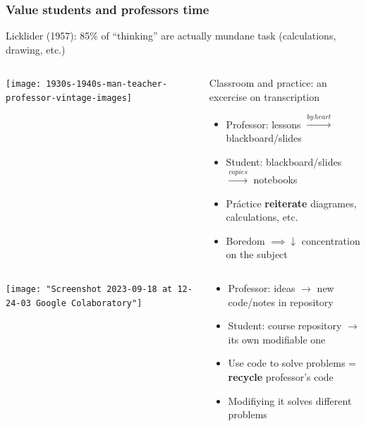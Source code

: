 \documentclass[aspectratio=169]{beamer}
\begin{document}
\begin{frame}
	\frametitle{Value students and professors time}
	Licklider (1957): 85\% of ``thinking'' are actually mundane task (calculations, drawing, etc.)
	\pause
	\begin{block}{}
	  \begin{columns}[b]
			\begin{column}{0.25\textwidth}
				\texttt{[image: 1930s-1940s-man-teacher-professor-vintage-images]}
			\end{column}
			\begin{column}{0.65\textwidth}
				Classroom and practice: an excercise on transcription
				\begin{itemize}[<+->]
					\item Professor: lessons \(\xrightarrow{by\, heart}\) blackboard/slides
					\item Student: blackboard/slides \(\xrightarrow{copies}\) notebooks
					\item Práctice \textbf{reiterate} diagrames, calculations, etc.
					\item Boredom \(\implies \downarrow\) concentration on the subject
				\end{itemize}
			\end{column}
		\end{columns}
	\end{block}
	\pause
	\begin{block}{}
	  \begin{columns}[b]
			\begin{column}{0.25\textwidth}
				\texttt{[image: "Screenshot 2023-09-18 at 12-24-03 Google Colaboratory"]}
			\end{column}
			\begin{column}{0.65\textwidth}
				\begin{itemize}[<+->]
					\item Professor: ideas \(\rightarrow\) new code/notes in repository
					\item Student: course repository \(\rightarrow\) its own modifiable one
					\item Use code to solve problems = \textbf{recycle} professor's code
					\item Modifiying it solves different problems
				\end{itemize}
			\end{column}
		\end{columns}
	\end{block}
\end{frame}
\end{document}
